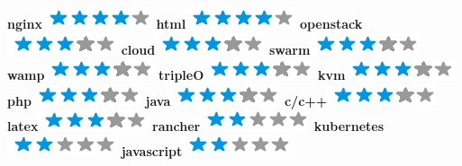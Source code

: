 \documentclass[]{friggeri-cv}
\begin{document}
\begin{aside}
        \textbf{nginx}\includegraphics[scale=0.40]{img/4stars.png}
        \textbf{html}\includegraphics[scale=0.40]{img/4stars.png}
        \textbf{openstack}\includegraphics[scale=0.40]{img/3stars.png}
        \textbf{cloud}\includegraphics[scale=0.40]{img/3stars.png}
        \textbf{swarm}\includegraphics[scale=0.40]{img/3stars.png}
        \textbf{wamp}\includegraphics[scale=0.40]{img/3stars.png}
        \textbf{tripleO}\includegraphics[scale=0.40]{img/3stars.png}
        \textbf{kvm}\includegraphics[scale=0.40]{img/3stars.png}
        \textbf{php}\includegraphics[scale=0.40]{img/3stars.png}
        \textbf{java}\includegraphics[scale=0.40]{img/3stars.png}
        \textbf{c/c++}\includegraphics[scale=0.40]{img/3stars.png}
        \textbf{latex}\includegraphics[scale=0.40]{img/3stars.png}
        \textbf{rancher}\includegraphics[scale=0.40]{img/2stars.png}
        \textbf{kubernetes}\includegraphics[scale=0.40]{img/2stars.png}
        \textbf{javascript}\includegraphics[scale=0.40]{img/2stars.png}
        ~

\end{aside}
\end{document}
